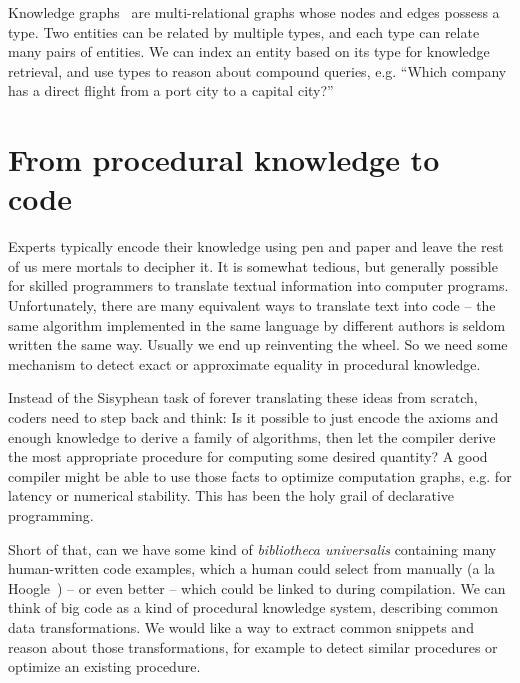 \documentclass[11pt]{article}
\begin{document}
    Knowledge graphs~\citep{hogan2020knowledge} are multi-relational graphs whose nodes and edges possess a type. Two entities can be related by multiple types, and each type can relate many pairs of entities. We can index an entity based on its type for knowledge retrieval, and use types to reason about compound queries, e.g. ``Which company has a direct flight from a port city to a capital city?''

%

    \pagebreak\section{From procedural knowledge to code}\label{sec:applications}

    Experts typically encode their knowledge using pen and paper and leave the rest of us mere mortals to decipher it. It is somewhat tedious, but generally possible for skilled programmers to translate textual information into computer programs. Unfortunately, there are many equivalent ways to translate text into code -- the same algorithm implemented in the same language by different authors is seldom written the same way. Usually we end up reinventing the wheel. So we need some mechanism to detect exact or approximate equality in procedural knowledge.

    Instead of the Sisyphean task of forever translating these ideas from scratch, coders need to step back and think: Is it possible to just encode the axioms and enough knowledge to derive a family of algorithms, then let the compiler derive the most appropriate procedure for computing some desired quantity? A good compiler might be able to use those facts to optimize computation graphs, e.g. for latency or numerical stability. This has been the holy grail of declarative programming.

    Short of that, can we have some kind of \textit{bibliotheca universalis} containing many human-written code examples, which a human could select from manually (a la Hoogle~\citep{james2020digging}) -- or even better -- which could be linked to during compilation. We can think of big code as a kind of procedural knowledge system, describing common data transformations. We would like a way to extract common snippets and reason about those transformations, for example to detect similar procedures or optimize an existing procedure.
\end{document}
